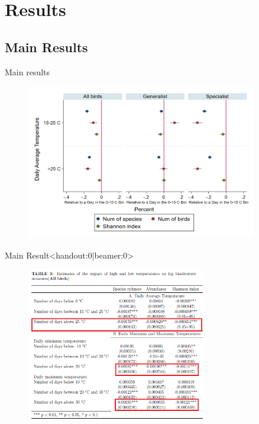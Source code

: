 \documentclass{beamer}
\begin{document}
\section{Results}

\subsection{Main Results}

\begin{frame}{Main results}
  \begin{figure}[h]
  \centering
  \includegraphics[width=0.9\textwidth]{result_mreasure1.png}
  \end{figure}
\end{frame}


\begin{frame}{Main Result}<handout:0|beamer:0>
  \begin{figure}[h]
  \centering
  \includegraphics[width=0.7\textwidth]{main_result.png}
  \end{figure}
\end{frame}
\end{document}
